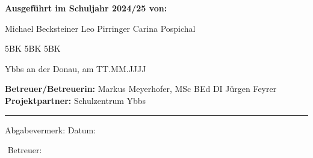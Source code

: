 \begin{titlepage}
\begin{center}
		
		\begin{minipage}[t]{0.92\textwidth}
			\begingroup
			\parfillskip=0pt
			\begin{minipage}[t]{0.46\textwidth}
				\textbf{Ausgeführt im Schuljahr 2024/25 von:} 
				\begin{minipage}[t]{0.50\textwidth}
					Michael Becksteiner \newline
					Leo Pirringer \newline
					Carina Pospichal \newline
				\end{minipage}
				\begin{minipage}[t]{0.11\textwidth}
					5BK \newline
					5BK \newline
					5BK \newline
				\end{minipage}
				\newline \newline
				Ybbs an der Donau, am TT.MM.JJJJ
			\end{minipage}
			\hfill\vline\hfill
			\begin{minipage}[t]{0.46\textwidth}
				\textbf{Betreuer/Betreuerin:} 
				\newline
				Markus Meyerhofer, MSc BEd \newline
				DI Jürgen Feyrer \newline
				\newline
				\textbf{Projektpartner:} Schulzentrum Ybbs
			\end{minipage}
			\par\endgroup
			\vspace{1cm}
		\end{minipage}
		
		\hrule
		\vspace{7mm}
		
		\begin{minipage}[t]{0.92\textwidth}
			\begingroup
			\parfillskip=0pt
			\begin{minipage}[t]{0.46\textwidth}
				Abgabevermerk:
				\newline
				\newline
				Datum:
			\end{minipage}%
			\hfill
			\begin{minipage}[t]{0.46\textwidth}
				$ $
				\newline
				\newline
				Betreuer:
			\end{minipage}%
			\par\endgroup
		\end{minipage}
		
	\end{center}
\end{titlepage}